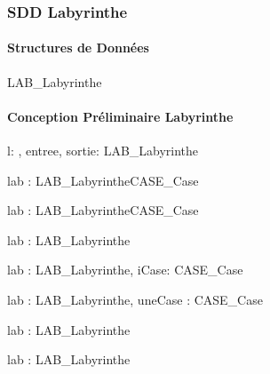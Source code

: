\subsubsection{SDD Labyrinthe}

\paragraph{Structures de Données}

\begin{algorithme}

    \begin{enregistrement}{LAB\_Labyrinthe}
    \end{enregistrement}

\end{algorithme}

\paragraph{Conception Préliminaire Labyrinthe}

\begin{algorithme}
    {l: \naturelNonNul, entree, sortie: \chaine}{LAB\_Labyrinthe}
    {}

    {lab : LAB\_Labyrinthe}{CASE\_Case}
    {}

    {lab : LAB\_Labyrinthe}{CASE\_Case}
    {}

    {lab : LAB\_Labyrinthe}{\naturelNonNul}
    {}

    {lab : LAB\_Labyrinthe, iCase: \naturelNonNul}{CASE\_Case}
    {}

    {lab : LAB\_Labyrinthe, uneCase : CASE\_Case}{}
    {}

    {lab : LAB\_Labyrinthe}{\chaine}
    {}

    {lab : LAB\_Labyrinthe}{\chaine}
    {}
\end{algorithme}

